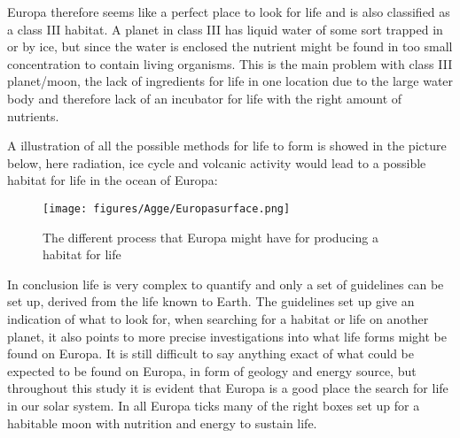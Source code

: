 Europa therefore seems like a perfect place to look for life and is also classified as a class III habitat. A planet in class III has liquid water of some sort trapped in or by ice, but since the water is enclosed the nutrient might be found in too small concentration to contain living organisms. This is the main problem with class III planet/moon, the lack of ingredients for life in one location due to the large water body and therefore lack of an incubator for life with the right amount of nutrients. \par
A illustration of all the possible methods for life to form is showed in the picture below, here radiation, ice cycle and volcanic activity would lead to a possible habitat for life in the ocean of Europa:\par

\begin{figure}[H]
\caption{The different process that Europa might have for producing a habitat for life}
\centering
\texttt{[image: figures/Agge/Europasurface.png]} 
\end{figure}

In conclusion life is very complex to quantify and only a set of guidelines can be set up, derived from the life known to Earth. The guidelines set up give an indication of what to look for, when searching for a habitat or life on another planet, it also points to more precise investigations into what life forms might be found on Europa. It is still difficult to say anything exact of what could be expected to be found on Europa, in form of geology and energy source, but throughout this study it is evident that Europa is a good place the search for life in our solar system. In all Europa ticks many of the right boxes set up for a habitable moon with nutrition and energy to sustain life.

